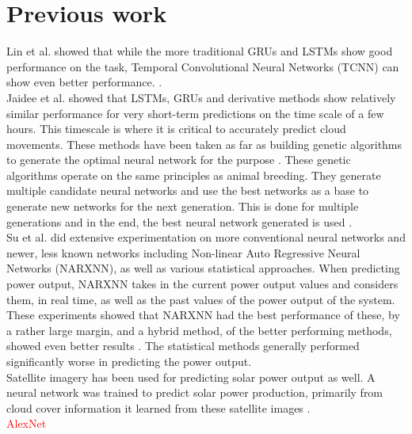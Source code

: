 \section{Previous work}
Lin et al. \cite{lin_temporal_2020} showed that while the more traditional GRUs and LSTMs show good performance on the task, Temporal Convolutional Neural Networks (TCNN) can show even better performance. \textit{} \cite{lin_temporal_2020}. \\
Jaidee et al. \cite{jaidee_very_2019} showed that LSTMs, GRUs and derivative methods show relatively similar performance for very short-term predictions on the time scale of a few hours. This timescale is where it is critical to accurately predict cloud movements. 
These methods have been taken as far as building genetic algorithms to generate the optimal neural network for the purpose \cite{jaidee_very_2019}. These genetic algorithms operate on the same principles as animal breeding. They generate multiple candidate neural networks and use the best networks as a base to generate new networks for the next generation. This is done for multiple generations and in the end, the best neural network generated is used \cite{jaidee_very_2019}.\\
Su et al. \cite{su_machine_2019} did extensive experimentation on more conventional neural networks and newer, less known networks including  Non-linear Auto Regressive Neural Networks (NARXNN), as well as various statistical approaches. When predicting power output, NARXNN takes in the current power output values and considers them, in real time, as well as the past values of the power output of the system. These experiments showed that NARXNN had the best performance of these, by a rather large margin, and a hybrid method, of the better performing methods, showed even better results \cite{anderson_using_2018}. The statistical methods generally performed significantly worse in predicting the power output. \\
Satellite imagery has been used for predicting solar power output as well. A neural network was trained to predict solar power production, primarily from cloud cover information it learned from these satellite images \cite{jang_solar_2016}.\\
\textcolor{red}{AlexNet}
